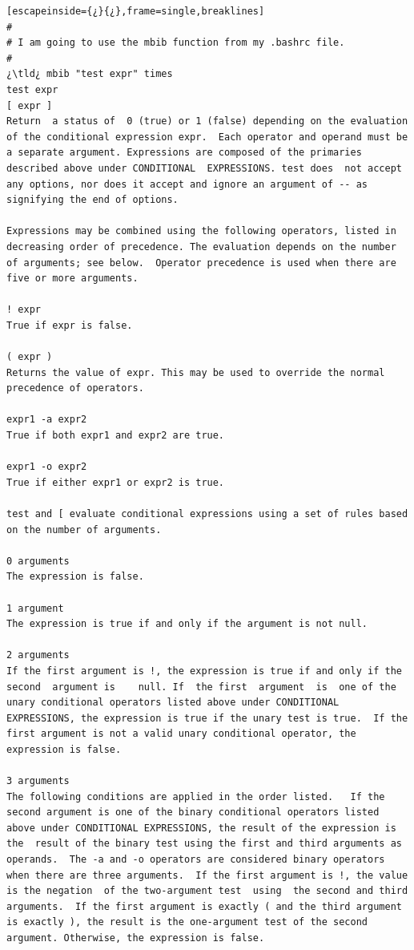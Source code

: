 \begin{lstlisting}[escapeinside={¿}{¿},frame=single,breaklines]
#
# I am going to use the mbib function from my .bashrc file.
#
¿\tld¿ mbib "test expr" times
test expr
[ expr ]
Return  a status of  0 (true) or 1 (false) depending on the evaluation of the conditional expression expr.  Each operator and operand must be a separate argument. Expressions are composed of the primaries described above under CONDITIONAL  EXPRESSIONS. test does  not accept any options, nor does it accept and ignore an argument of -- as signifying the end of options.

Expressions may be combined using the following operators, listed in decreasing order of precedence. The evaluation depends on the number of arguments; see below.  Operator precedence is used when there are five or more arguments.

! expr 
True if expr is false.

( expr )
Returns the value of expr. This may be used to override the normal precedence of operators.

expr1 -a expr2
True if both expr1 and expr2 are true.

expr1 -o expr2
True if either expr1 or expr2 is true.

test and [ evaluate conditional expressions using a set of rules based on the number of arguments.

0 arguments
The expression is false.

1 argument
The expression is true if and only if the argument is not null.

2 arguments
If the first argument is !, the expression is true if and only if the second  argument is	 null. If  the first  argument  is  one of the unary conditional operators listed above under CONDITIONAL EXPRESSIONS, the expression is true if the unary test is true.  If the first argument is not a valid unary conditional operator, the expression is false.

3 arguments
The following conditions are applied in the order listed.	If the second argument is one of the binary conditional operators listed above under CONDITIONAL EXPRESSIONS, the result of the expression is  the  result of the binary test using the first and third arguments as operands.  The -a and -o operators are considered binary operators when there are three arguments.  If the first argument is !, the value is the negation  of the two-argument test  using  the second and third arguments.  If the first argument is exactly ( and the third argument is exactly ), the result is the one-argument test of the second  argument. Otherwise, the expression is false.


\end{lstlisting}
